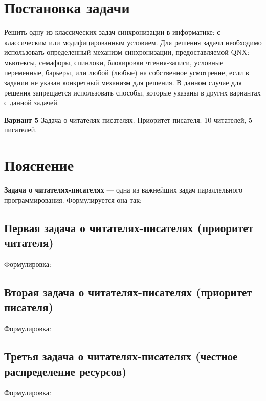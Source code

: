 \documentclass[russian,a4paper,12pt]{scrartcl}
\begin{document}
	\section{Постановка задачи}
	Решить одну из классических задач синхронизации в информатике: с классическим или модифицированным условием. Для решения задачи необходимо использовать определенный механизм синхронизации, предоставляемой QNX: мьютексы, семафоры, спинлоки, блокировки чтения-записи, условные переменные,  барьеры, или любой (любые) на собственное усмотрение, если в задании не указан конкретный механизм для решения. В данном случае для решения запрещается использовать способы, которые указаны в других вариантах с данной задачей.\par
	\textbf{Вариант 5}
	Задача о читателях-писателях. Приоритет писателя. 10 читателей, 5 писателей.
	\section{Пояснение}
	\textbf{Задача о читателях-писателях} — одна из важнейших задач параллельного программирования. Формулируется она так:\par
	\subsection{Первая задача о читателях-писателях (приоритет читателя)}
	Формулировка:\par
	\subsection{Вторая задача о читателях-писателях (приоритет писателя)}
	Формулировка:\par
	\subsection{Третья задача о читателях-писателях (честное распределение ресурсов)}
	Формулировка:\par
	\newpage
\end{document}
